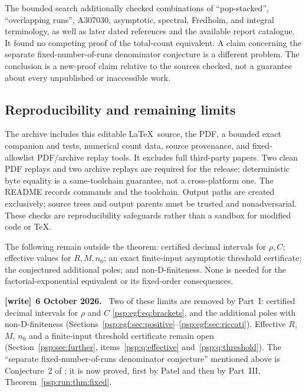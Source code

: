 \documentclass[11pt,letterpaper]{article}
\numberwithin{equation}{section}
\theoremstyle{remark}\newtheorem{remark}[theorem]{Remark}
\newenvironment{writenote}[1][]{\par\smallskip\begingroup\small
 \noindent\textbf{[write]}\if\relax\detokenize{#1}\relax\else~\textbf{#1.}\fi\ }%
 {\par\endgroup\smallskip}
\begin{document}
The bounded search additionally checked combinations of
``pop-stacked'', ``overlapping runs'', A307030, asymptotic, spectral,
Fredholm, and integral terminology, as well as later dated references
and the available report catalogue. It found no competing proof of
the total-count equivalent. A claim concerning the separate
fixed-number-of-runs denominator conjecture is a different problem.
The conclusion is a new-proof claim relative to the sources checked,
not a guarantee about every unpublished or inaccessible work.

\subsection{Reproducibility and remaining limits}
The archive includes this editable \LaTeX\ source, the PDF, a bounded
exact companion and tests, numerical count data, source provenance,
and fixed-allowlist PDF/archive replay tools. It excludes full
third-party papers. Two clean PDF replays and two archive replays
are required for the release; deterministic byte equality is a
same-toolchain guarantee, not a cross-platform one. The README
records commands and the toolchain. Output paths are created
exclusively; source trees and output parents must be trusted and
nonadversarial. These checks are reproducibility safeguards rather
than a sandbox for modified code or \TeX.

The following remain outside the theorem: certified decimal
intervals for $\rho,C$; effective values for $R,M,n_0$; an exact
finite-input asymptotic threshold certificate; the conjectured
additional poles; and non-D-finiteness. None is needed for the
factorial-exponential equivalent or its fixed-order consequences.
\begin{writenote}[6 October 2026]
Two of these limits are removed by Part~I: certified decimal intervals for $\rho$ and $C$ \eqref{psp:egf:eq:brackets}, and the additional poles with non-D-finiteness (Sections~\ref{psp:egf:sec:positive}--\ref{psp:egf:sec:riccati}). Effective $R$, $M$, $n_0$ and a finite-input threshold certificate remain open (Section~\ref{psp:sec:further}, items~\ref{psp:q:effective} and~\ref{psp:q:threshold}). The ``separate fixed-number-of-runs denominator conjecture'' mentioned above is Conjecture~2 of \cite{cgp}; it is now proved, first by Patel \cite{patel} and then by Part~III, Theorem~\ref{psp:run:thm:fixed}.
\end{writenote}
\clearpage
\end{document}
